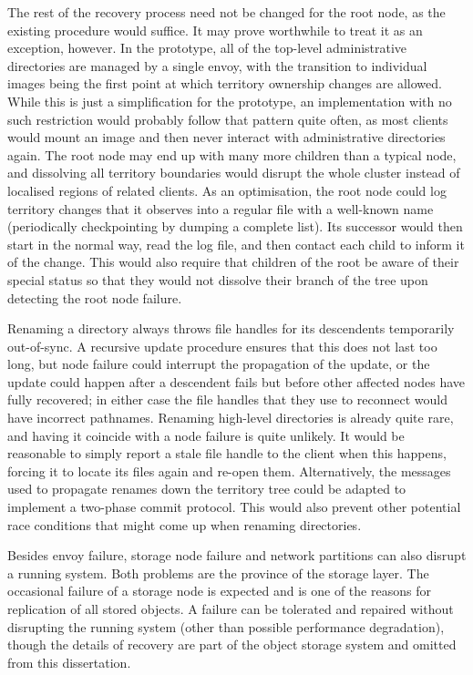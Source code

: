 The rest of the recovery process need not be changed for the root node, as the existing procedure would suffice. It may prove worthwhile to treat it as an exception, however. In the prototype, all of the top-level administrative directories are managed by a single envoy, with the transition to individual images being the first point at which territory ownership changes are allowed. While this is just a simplification for the prototype, an implementation with no such restriction would probably follow that pattern quite often, as most clients would mount an image and then never interact with administrative directories again. The root node may end up with many more children than a typical node, and dissolving all territory boundaries would disrupt the whole cluster instead of localised regions of related clients. As an optimisation, the root node could log territory changes that it observes into a regular file with a well-known name (periodically checkpointing by dumping a complete list). Its successor would then start in the normal way, read the log file, and then contact each child to inform it of the change. This would also require that children of the root be aware of their special status so that they would not dissolve their branch of the tree upon detecting the root node failure.

Renaming a directory always throws file handles for its descendents temporarily out-of-sync. A recursive update procedure ensures that this does not last too long, but node failure could interrupt the propagation of the update, or the update could happen after a descendent fails but before other affected nodes have fully recovered; in either case the file handles that they use to reconnect would have incorrect pathnames. Renaming high-level directories is already quite rare, and having it coincide with a node failure is quite unlikely. It would be reasonable to simply report a stale file handle to the client when this happens, forcing it to locate its files again and re-open them. Alternatively, the messages used to propagate renames down the territory tree could be adapted to implement a two-phase commit protocol. This would also prevent other potential race conditions that might come up when renaming directories.

Besides envoy failure, storage node failure and network partitions can also disrupt a running system. Both problems are the province of the storage layer. The occasional failure of a storage node is expected and is one of the reasons for replication of all stored objects. A failure can be tolerated and repaired without disrupting the running system (other than possible performance degradation), though the details of recovery are part of the object storage system and omitted from this dissertation.

